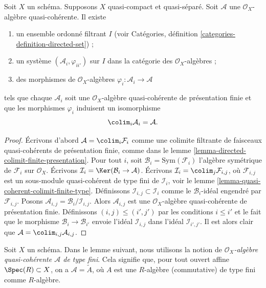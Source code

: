 \begin{lemma}
\label{lemma-algebra-directed-colimit-finite-presentation}
Soit $X$ un schéma. Supposons $X$ quasi-compact et quasi-séparé.
Soit $\mathcal{A}$ une $\mathcal{O}_X$-algèbre quasi-cohérente.
Il existe
\begin{enumerate}
\item un ensemble ordonné filtrant $I$ (voir
Catégories, définition \ref{categories-definition-directed-set}) ;
\item un système $(\mathcal{A}_i, \varphi_{ii'})$
sur $I$ dans la catégorie des $\mathcal{O}_X$-algèbres ;
\item des morphismes de $\mathcal{O}_X$-algèbres
$\varphi_i : \mathcal{A}_i \to \mathcal{A}$
\end{enumerate}
tels que chaque $\mathcal{A}_i$ soit une $\mathcal{O}_X$-algèbre quasi-cohérente
de présentation finie et que les morphismes $\varphi_i$
induisent un isomorphisme
$$
\colim_i \mathcal{A}_i
=
\mathcal{A}.
$$
\end{lemma}

\begin{proof}
Écrivons d'abord $\mathcal{A} = \colim_i \mathcal{F}_i$ comme une colimite
filtrante de faisceaux quasi-cohérents de présentation finie, comme dans le
lemme \ref{lemma-directed-colimit-finite-presentation}.
Pour tout $i$, soit $\mathcal{B}_i = \text{Sym}(\mathcal{F}_i)$ l'algèbre
symétrique de $\mathcal{F}_i$ sur $\mathcal{O}_X$. Écrivons
$\mathcal{I}_i = \Ker(\mathcal{B}_i \to \mathcal{A})$. Écrivons
$\mathcal{I}_i = \colim_j \mathcal{F}_{i, j}$, où
$\mathcal{F}_{i, j}$ est un sous-module quasi-cohérent de type fini de
$\mathcal{I}_i$, voir le
lemme \ref{lemma-quasi-coherent-colimit-finite-type}.
Définissons $\mathcal{I}_{i, j} \subset \mathcal{I}_i$
comme le $\mathcal{B}_i$-idéal engendré par $\mathcal{F}_{i, j}$.
Posons $\mathcal{A}_{i, j} = \mathcal{B}_i/\mathcal{I}_{i, j}$.
Alors $\mathcal{A}_{i, j}$ est une
$\mathcal{O}_X$-algèbre quasi-cohérente de présentation finie. Définissons $(i, j) \leq (i', j')$ par
les conditions $i \leq i'$ et le fait que le morphisme $\mathcal{B}_i \to \mathcal{B}_{i'}$
envoie l'idéal $\mathcal{I}_{i, j}$ dans l'idéal $\mathcal{I}_{i', j'}$.
Il est alors clair que $\mathcal{A} = \colim_{i, j} \mathcal{A}_{i, j}$.
\end{proof}

\noindent
Soit $X$ un schéma. Dans le lemme suivant, nous utilisons la notion
de {\it $\mathcal{O}_X$-algèbre quasi-cohérente $\mathcal{A}$
de type fini}. Cela signifie que, pour tout ouvert affine
$\Spec(R) \subset X$, on a $\mathcal{A} = \widetilde{A}$,
où $A$ est une $R$-algèbre (commutative) de type fini
comme $R$-algèbre.


